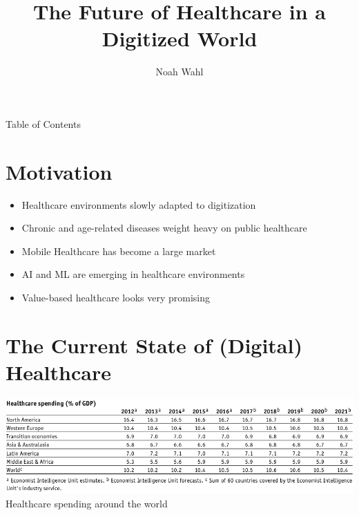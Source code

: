 \documentclass[xcolor=dvipsnames, aspectratio=1610]{beamer}
\title{The Future of Healthcare in a Digitized World}
\author{Noah Wahl}
\begin{document}
\frame{\titlepage}

\begin{frame}{Table of Contents}
    \tableofcontents
\end{frame}

\section{Motivation}%
\label{sec:motivation}

\begin{frame}{\secname}
    \begin{itemize}[<+->]
        \item Healthcare environments slowly adapted to digitization \cite{industryDigitalization}
        \item Chronic and age-related diseases weight heavy on public healthcare \cite{sambamoorthi2015multiple}
        \item Mobile Healthcare has become a large market
        \item AI and ML are emerging in healthcare environments
        \item Value-based healthcare looks very promising
    \end{itemize}
\end{frame}

\section{The Current State of (Digital) Healthcare}%
\label{sec:the_current_state_of_digital_healthcare}

\begin{frame}{\secname}
    \centering
    \includegraphics[width=\textwidth]{../media/Screenshot_2020-01-09_01_FULL_REPORT-World_healthcare_and.png} \\
    \small{Healthcare spending around the world \cite{EIU2016}}
\end{frame}
\end{document}

